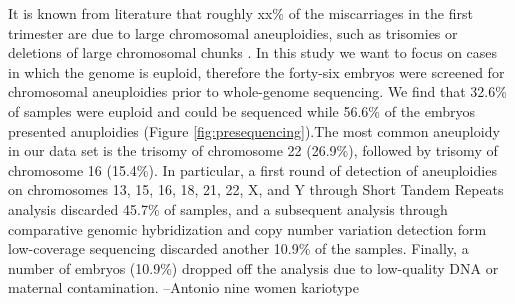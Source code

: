 \documentclass[fleqn,10pt]{wlscirep}
\begin{document}

It is known from literature that roughly xx\% of the miscarriages in the first trimester are due to large chromosomal aneuploidies, such as trisomies or deletions of large chromosomal chunks \cite{goddijn2000genetic,zhang2009genetic}. In this study we want to focus on cases in which the genome is euploid, therefore the forty-six embryos were screened for chromosomal aneuploidies prior to whole-genome sequencing. We find that 32.6\% of samples were euploid and could be sequenced while 56.6\% of the embryos presented anuploidies (Figure \ref{fig:presequencing}).The most common aneuploidy in our data set is the trisomy of chromosome 22 (26.9\%), followed by trisomy of chromosome 16 (15.4\%). In particular, a first round of detection of aneuploidies on chromosomes 13, 15, 16, 18, 21, 22, X, and Y through Short Tandem Repeats analysis discarded 45.7\% of samples, %
and a subsequent analysis through comparative genomic hybridization and copy number variation detection form low-coverage sequencing discarded another 10.9\% of the samples. Finally, a number of embryos (10.9\%) dropped off the analysis due to low-quality DNA or maternal contamination. 
{\color{blue}--Antonio nine women kariotype}  
\end{document}
